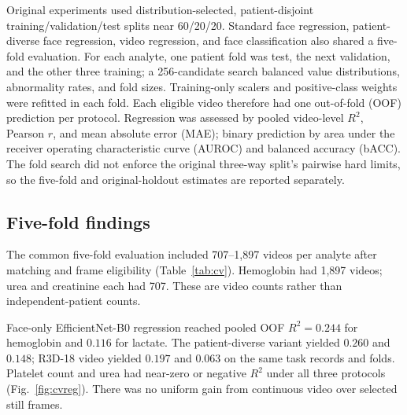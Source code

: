 \documentclass[10pt,a4paper]{article}
\begin{document}
\begin{center}
\begin{minipage}{\linewidth}
\centering

\label{fig:singlearch}
\end{minipage}
\end{center}

Original experiments used distribution-selected, patient-disjoint training/validation/test splits near 60/20/20. Standard face regression, patient-diverse face regression, video regression, and face classification also shared a five-fold evaluation. For each analyte, one patient fold was test, the next validation, and the other three training; a 256-candidate search balanced value distributions, abnormality rates, and fold sizes. Training-only scalers and positive-class weights were refitted in each fold. Each eligible video therefore had one out-of-fold (OOF) prediction per protocol. Regression was assessed by pooled video-level $R^2$, Pearson $r$, and mean absolute error (MAE); binary prediction by area under the receiver operating characteristic curve (AUROC) and balanced accuracy (bACC). The fold search did not enforce the original three-way split's pairwise hard limits, so the five-fold and original-holdout estimates are reported separately.

\subsection{Five-fold findings}

The common five-fold evaluation included 707--1,897 videos per analyte after matching and frame eligibility (Table~\ref{tab:cv}). Hemoglobin had 1,897 videos; urea and creatinine each had 707. These are video counts rather than independent-patient counts.

Face-only EfficientNet-B0 regression reached pooled OOF $R^2=0.244$ for hemoglobin and $0.116$ for lactate. The patient-diverse variant yielded $0.260$ and $0.148$; R3D-18 video yielded $0.197$ and $0.063$ on the same task records and folds. Platelet count and urea had near-zero or negative $R^2$ under all three protocols (Fig.~\ref{fig:cvreg}). There was no uniform gain from continuous video over selected still frames.
\end{document}
